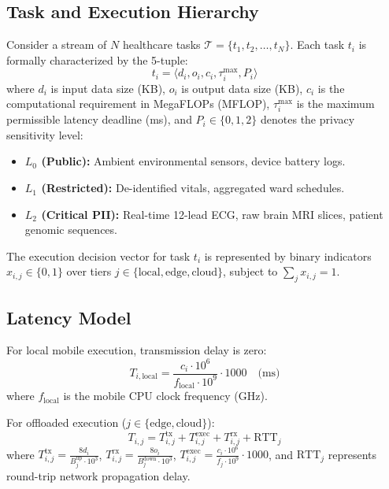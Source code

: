 \documentclass[conference]{IEEEtran}
\begin{document}
\subsection{Task and Execution Hierarchy}
Consider a stream of $N$ healthcare tasks $\mathcal{T} = \{t_1, t_2, \dots, t_N\}$. Each task $t_i$ is formally characterized by the 5-tuple:
\begin{equation}
    t_i = \langle d_i, o_i, c_i, \tau_i^{\max}, P_i \rangle
\end{equation}
where $d_i$ is input data size (KB), $o_i$ is output data size (KB), $c_i$ is the computational requirement in MegaFLOPs (MFLOP), $\tau_i^{\max}$ is the maximum permissible latency deadline (ms), and $P_i \in \{0, 1, 2\}$ denotes the privacy sensitivity level:
\begin{itemize}
    \item \textbf{$L_0$ (Public):} Ambient environmental sensors, device battery logs.
    \item \textbf{$L_1$ (Restricted):} De-identified vitals, aggregated ward schedules.
    \item \textbf{$L_2$ (Critical PII):} Real-time 12-lead ECG, raw brain MRI slices, patient genomic sequences.
\end{itemize}

The execution decision vector for task $t_i$ is represented by binary indicators $x_{i, j} \in \{0, 1\}$ over tiers $j \in \{\text{local}, \text{edge}, \text{cloud}\}$, subject to $\sum_{j} x_{i, j} = 1$.

\subsection{Latency Model}
For local mobile execution, transmission delay is zero:
\begin{equation}
    T_{i, \text{local}} = \frac{c_i \cdot 10^6}{f_{\text{local}} \cdot 10^9} \cdot 1000 \quad \text{(ms)}
\end{equation}
where $f_{\text{local}}$ is the mobile CPU clock frequency (GHz).

For offloaded execution ($j \in \{\text{edge}, \text{cloud}\}$):
\begin{equation}
    T_{i, j} = T_{i, j}^{\text{tx}} + T_{i, j}^{\text{exec}} + T_{i, j}^{\text{rx}} + \text{RTT}_j
\end{equation}
where $T_{i, j}^{\text{tx}} = \frac{8 d_i}{B_j^{\text{up}} \cdot 10^3}$, $T_{i, j}^{\text{rx}} = \frac{8 o_i}{B_j^{\text{down}} \cdot 10^3}$, $T_{i, j}^{\text{exec}} = \frac{c_i \cdot 10^6}{f_j \cdot 10^9} \cdot 1000$, and $\text{RTT}_j$ represents round-trip network propagation delay.
\end{document}
